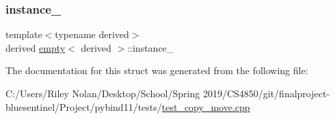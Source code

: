 \subsubsection{\texorpdfstring{instance\_}{instance\_}}
{\footnotesize\ttfamily template$<$typename derived$>$ \\
derived \mbox{\hyperlink{structempty}{empty}}$<$ derived $>$\+::instance\+\_\+\hspace{0.3cm}{\ttfamily [static]}}



The documentation for this struct was generated from the following file\+:\begin{DoxyCompactItemize}
\item 
C\+:/\+Users/\+Riley Nolan/\+Desktop/\+School/\+Spring 2019/\+C\+S4850/git/finalproject-\/bluesentinel/\+Project/pybind11/tests/\mbox{\hyperlink{test__copy__move_8cpp}{test\+\_\+copy\+\_\+move.\+cpp}}\end{DoxyCompactItemize}
